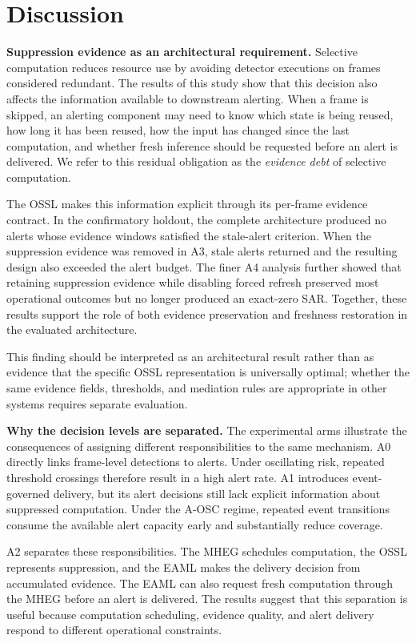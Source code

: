 \documentclass[conference]{IEEEtran}
\begin{document}
\section{Discussion}
\label{sec:discussion}

\textbf{Suppression evidence as an architectural requirement.}
Selective computation reduces resource use by avoiding detector
executions on frames considered redundant. The results of this study
show that this decision also affects the information available to
downstream alerting. When a frame is skipped, an alerting component may
need to know which state is being reused, how long it has been reused,
how the input has changed since the last computation, and whether fresh
inference should be requested before an alert is delivered. We refer to
this residual obligation as the \emph{evidence debt} of selective
computation.

The OSSL makes this information explicit through its per-frame evidence
contract. In the confirmatory holdout, the complete architecture produced
no alerts whose evidence windows satisfied the stale-alert criterion.
When the suppression evidence was removed in A3, stale alerts returned
and the resulting design also exceeded the alert budget. The finer A4
analysis further showed that retaining suppression evidence while
disabling forced refresh preserved most operational outcomes but no
longer produced an exact-zero SAR. Together, these results support the
role of both evidence preservation and freshness restoration in the
evaluated architecture.

This finding should be interpreted as an architectural result rather
than as evidence that the specific OSSL representation is universally
optimal; whether the same evidence fields, thresholds, and mediation
rules are appropriate in other systems requires separate evaluation.

\textbf{Why the decision levels are separated.}
The experimental arms illustrate the consequences of assigning different
responsibilities to the same mechanism. A0 directly links frame-level
detections to alerts. Under oscillating risk, repeated threshold crossings
therefore result in a high alert rate. A1 introduces event-governed
delivery, but its alert decisions still lack explicit information about
suppressed computation. Under the A-OSC regime, repeated event transitions
consume the available alert capacity early and substantially reduce
coverage.

A2 separates these responsibilities. The MHEG schedules computation,
the OSSL represents suppression, and the EAML makes the delivery
decision from accumulated evidence. The EAML can also request fresh
computation through the MHEG before an alert is delivered. The results
suggest that this separation is useful because computation scheduling,
evidence quality, and alert delivery respond to different operational
constraints.
\end{document}

